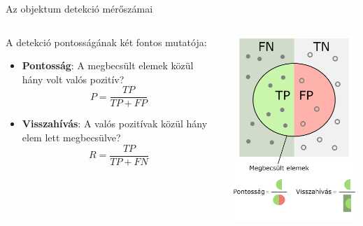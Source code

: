 \documentclass[english, aspectratio=169]{beamer}
\begin{document}
	\begin{frame}{Az objektum detekció mérőszámai}
		\begin{columns}
			\begin{column}{.5\textwidth}
				A detekció pontosságának két fontos mutatója:
				\begin{itemize}
					\item \textbf{Pontosság}: A megbecsült elemek közül hány volt valós pozitív? 
					\[
					P=\frac{TP}{TP+FP}
					\]
					\item \textbf{Visszahívás}: A valós pozitívak közül hány elem lett megbecsülve? 
					\[
					R=\frac{TP}{TP+FN}
					\]
				\end{itemize}
			\end{column}
			\begin{column}{.5\textwidth}
				\begin{center}
					\includegraphics[width=7cm, height=7cm, keepaspectratio]{images/od_11.png}
				\end{center}
			\end{column}
		\end{columns}
	\end{frame}
	
\end{document}
